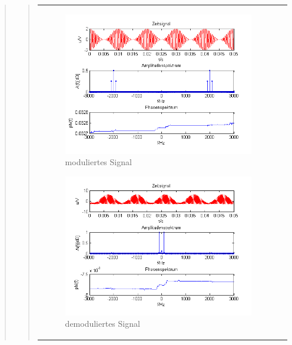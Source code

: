 \begin{quote}
\begin{quote}
\begin{center}
\begin{tabular}{ll}
\begin{minipage}{0.67\textwidth}
                \begin{figure}[H]
                    \includegraphics[scale=0.7]{Bilder/Am_Cos_2k_100Hz_mo}
                    \caption{moduliertes Signal}
                    \label{fig:DemocosinusoT}
                \end{figure}
        
            \end{minipage}
        
            \begin{minipage}{0.67\textwidth}
                \begin{figure}[H]
                    \includegraphics[scale=0.7]{Bilder/Demo_Sin_2k_100Hz_mo_ohneTiefpass}
                    \caption{demoduliertes Signal}
                     \label{fig:DemocosinusoT2}
                \end{figure}
        

\end{minipage}
\end{tabular}
\end{center}
\end{quote}
\end{quote}
